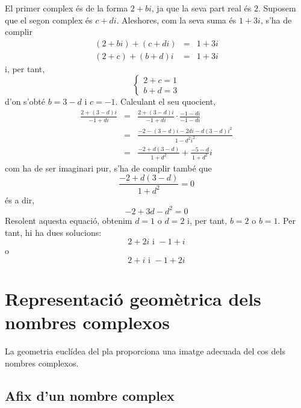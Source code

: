 \begin{solucio}
El primer complex és de la forma $2+bi$, ja que la seva part real és $2$.
Suposem que el segon complex és $c+di$. Aleshores, com la seva suma és $
1+3i $, s’ha de complir
\begin{eqnarray*}
(2+bi)+(c+di) &=&1+3i \\
(2+c)+(b+d)i &=&1+3i
\end{eqnarray*}
i, per tant,
\begin{equation*}
\left\{
\begin{array}{l}
2+c=1 \\
b+d=3
\end{array}
\right.
\end{equation*}
d’on s’obté $b=3-d$ i $c=-1$. Calculant el seu quocient,
\begin{eqnarray*}
\frac{2+(3-d)i}{-1+di} &=&\frac{2+(3-d)i}{-1+di}\cdot \frac{-1-di}{-1-di} \\
&=&\frac{-2-(3-d)i-2di-d(3-d)i^{2}}{1-d^{2}i^{2}} \\
&=&\frac{-2+d(3-d)}{1+d^{2}}+\frac{-5-d}{1+d^{2}}i
\end{eqnarray*}
com ha de ser imaginari pur, s’ha de complir també que
\begin{equation*}
\frac{-2+d(3-d)}{1+d^{2}}=0
\end{equation*}
és a dir,
\begin{equation*}
-2+3d-d^{2}=0
\end{equation*}
Resolent aquesta equació, obtenim $d=1$ o $d=2$ i, per tant, $b=2$ o
$b=1$. Per tant, hi ha dues solucions:
\begin{equation*}
2+2i\text{ \ \ \ i \ \ \ }-1+i
\end{equation*}
o
\begin{equation*}
2+i\text{ \ \ \ i \ \ \ }-1+2i
\end{equation*}
\end{solucio}

\section{Representació geomètrica dels nombres complexos}

La geometria euclídea del pla proporciona una imatge adecuada
del cos dels nombres complexos.

\subsection{Afix d’un nombre complex}

